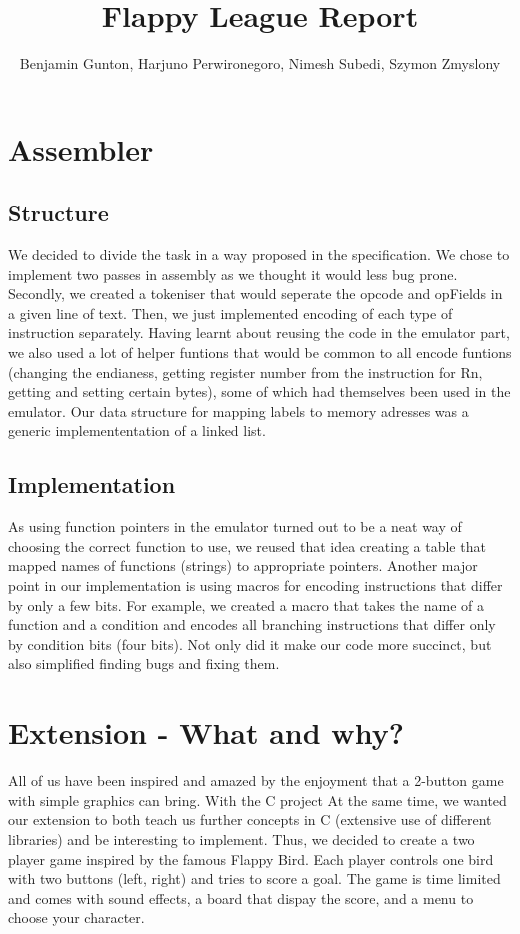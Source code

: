 \documentclass[11pt]{article}
\begin{document}
\title{Flappy League Report}
\author{Benjamin Gunton, Harjuno Perwironegoro, Nimesh Subedi, Szymon Zmyslony}

\maketitle
\section{Assembler}
\subsection{Structure}
 We decided to divide the task in a way proposed in the specification. We chose to implement two passes in assembly as we thought it would less bug prone. Secondly, we created a tokeniser that would seperate the opcode and opFields in a given line of text. Then, we just implemented encoding of each type of instruction separately. Having learnt about reusing the code in the emulator part, we also used a lot of helper funtions that would be common to all encode funtions (changing the endianess, getting register number from the instruction for Rn, getting and setting certain bytes), some of which had themselves been used in the emulator. Our data structure for mapping labels to memory adresses was a generic implemententation of a linked list. 
\subsection{Implementation}
As using function pointers in the emulator turned out to be a neat way of choosing the correct function to use, we reused that idea creating a table that mapped names of functions (strings) to appropriate pointers. Another major point in our implementation is using macros for encoding instructions that differ by only a few bits. For example, we created a macro that takes the name of a function and a condition and encodes all branching instructions that differ only by condition bits (four bits). Not only did it make our code more succinct, but also simplified finding bugs and fixing them.
\section{Extension - What and why?}
All of us have been inspired and amazed by the enjoyment that a 2-button game with simple graphics can bring. With the C project At the same time, we wanted our extension to both teach us further concepts in C (extensive use of different libraries) and be interesting to implement. Thus, we decided to create a two player game inspired by the famous Flappy Bird. Each player controls one bird with two buttons (left, right) and tries to score a goal. The game is time limited and comes with sound effects, a board that dispay the score, and a menu to choose your character.
\end{document}
